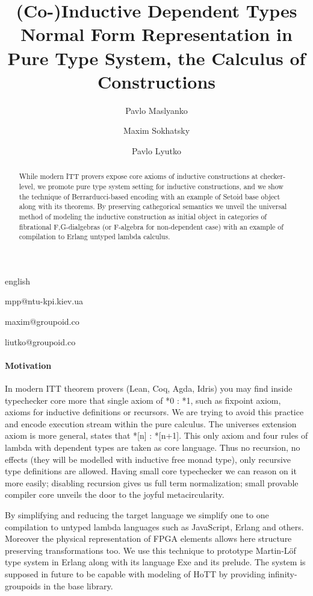 \documentclass{abstract}
\begin{document}
\begin{theses}{english}

\title{(Co-)Inductive Dependent Types Normal Form Representation in Pure Type System, the Calculus of Constructions}
\author[1]{Pavlo Maslyanko}{mpp@ntu-kpi.kiev.ua}
\author[2]{Maxim Sokhatsky}{maxim@groupoid.co}
\author[3]{Pavlo Lyutko}{liutko@groupoid.co}
\maketitle

\begin{abstract}
While modern ITT provers expose core axioms of inductive constructions at checker-level,
we promote pure type system setting for inductive constructions, and we show the
technique of Berrarducci-based encoding with an example of Setoid base object along with its theorems.
By preserving cathegorical semantics we unveil the universal method of modeling the
inductive construction as initial object in categories of fibrational F,G-dialgebras (or F-algebra
for non-dependent case) with an example of compilation to Erlang untyped lambda calculus.
\end{abstract}

\paragraph{Motivation}

In modern ITT theorem provers (Lean, Coq, Agda, Idris) you may find inside typechecker core more that
single axiom of *0 : *1, such as fixpoint axiom, axioms for inductive definitions or recursors.
We are trying to avoid this practice and encode execution stream within the pure calculus.
The universes extension axiom is more general, states that *[n] : *[n+1]. This only axiom and four
rules of lambda with dependent types are taken as core language. Thus no recursion,
no effects (they will be modelled with inductive free monad type), only recursive type definitions are allowed.
Having small core typechecker we can reason on it more easily; disabling recursion gives
us full term normalization; small provable compiler core unveils the door to the joyful metacircularity.

By simplifying and reducing the target language we simplify one to one compilation to untyped
lambda languages such as JavaScript, Erlang and others. Moreover the physical representation
of FPGA elements allows here structure preserving transformations too. We use this technique to prototype
 Martin-Löf type system in Erlang along with its language Exe and its prelude.
The system is supposed in future to be capable with modeling of HoTT by providing infinity-groupoids in the base library.


\end{theses}
\end{document}
